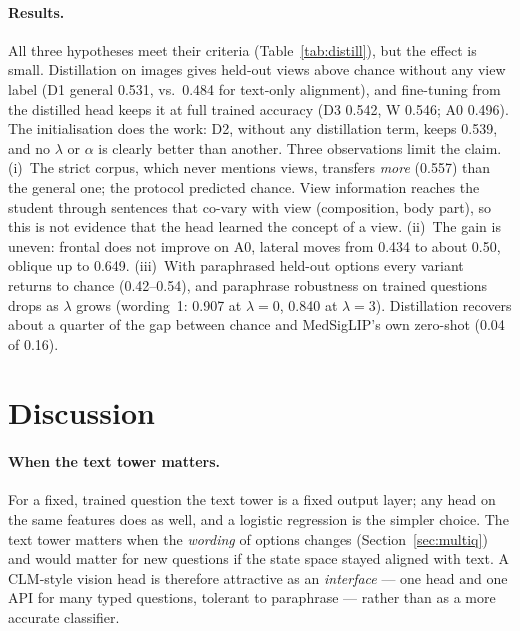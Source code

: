 \documentclass[11pt]{article}
\begin{document}
\paragraph{Results.} All three hypotheses meet their criteria (Table~\ref{tab:distill}), but the effect is small.
Distillation on images gives held-out views above chance without any view label (D1 general 0.531, vs.\ 0.484 for
text-only alignment), and fine-tuning from the distilled head keeps it at full trained accuracy (D3 0.542, W 0.546;
A0 0.496). The initialisation does the work: D2, without any distillation term, keeps 0.539, and no $\lambda$ or
$\alpha$ is clearly better than another. Three observations limit the claim. (i)~The strict corpus, which never
mentions views, transfers \emph{more} (0.557) than the general one; the protocol predicted chance. View information
reaches the student through sentences that co-vary with view (composition, body part), so this is not evidence that
the head learned the concept of a view. (ii)~The gain is uneven: frontal does not improve on A0, lateral moves from
0.434 to about 0.50, oblique up to 0.649. (iii)~With paraphrased held-out options every variant returns to chance
(0.42--0.54), and paraphrase robustness on trained questions drops as $\lambda$ grows (wording~1: 0.907 at
$\lambda=0$, 0.840 at $\lambda=3$). Distillation recovers about a quarter of the gap between chance and MedSigLIP's
own zero-shot (0.04 of 0.16).

\section{Discussion}

\paragraph{When the text tower matters.} For a fixed, trained question the text tower is a fixed output layer; any
head on the same features does as well, and a logistic regression is the simpler choice. The text tower matters
when the \emph{wording} of options changes (Section~\ref{sec:multiq}) and would matter for new questions if the
state space stayed aligned with text. A CLM-style vision head is therefore attractive as an \emph{interface} --- one
head and one API for many typed questions, tolerant to paraphrase --- rather than as a more accurate classifier.
\end{document}
